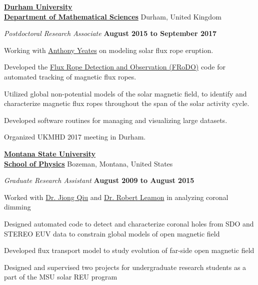 \documentclass[10pt]{article}
\newenvironment{outerlist}[1][\enskip\textbullet]%
        {\begin{enumerate}[#1]}{\end{enumerate}%
         \vspace{-.6\baselineskip}}
\newenvironment{innerlist}[1][\enskip\textbullet]%
        {\begin{compactenum}[#1]}{\end{compactenum}}
\begin{document}
\href{https://www.dur.ac.uk}{\textbf{Durham University}}\\
\href{https://www.dur.ac.uk/mathematical.sciences/}{\textbf{Department of Mathematical Sciences}}
\hfill Durham, United Kingdom
\begin{outerlist}
\item[] \textit{Postdoctoral Research Associate}%
        \hfill \textbf{August 2015 to September 2017}
\begin{innerlist}
  \item Working with \href{http://www.maths.dur.ac.uk/~bmjg46/}{Anthony Yeates} on modeling solar flux rope eruption.
  \item Developed the \href{https://github.com/lowderchris/FRoDO}{Flux Rope Detection and Observation (FRoDO)} code for automated tracking of magnetic flux ropes.
  \item Utilized global non-potential models of the solar magnetic field, to identify and characterize magnetic flux ropes throughout the span of the solar activity cycle.
  \item Developed software routines for managing and visualizing large datasets.
  \item Organized UKMHD 2017 meeting in Durham.
  \\
\end{innerlist}

\end{outerlist}

\href{http://www.montana.edu}{\textbf{Montana State University}}\\
\href{http://www.physics.montana.edu}{\textbf{School of Physics}}
\hfill Bozeman, Montana, United States
\begin{outerlist}
\item[] \textit{Graduate Research Assistant}%
        \hfill \textbf{August 2009 to August 2015}
\begin{innerlist}
  \item Worked with \href{http://solar.physics.montana.edu/qiuj/}{Dr. Jiong Qiu} and \href{http://solar.physics.montana.edu/leamon/}{Dr. Robert Leamon} in analyzing coronal dimming
  \item Designed automated code to detect and characterize coronal holes from SDO and STEREO EUV data to constrain global models of open magnetic field
  \item Developed flux transport model to study evolution of far-side open magnetic field
  \item Designed and supervised two projects for undergraduate research students as a part of the MSU solar REU program
  \\
\end{innerlist}

\end{outerlist}
\end{document}
